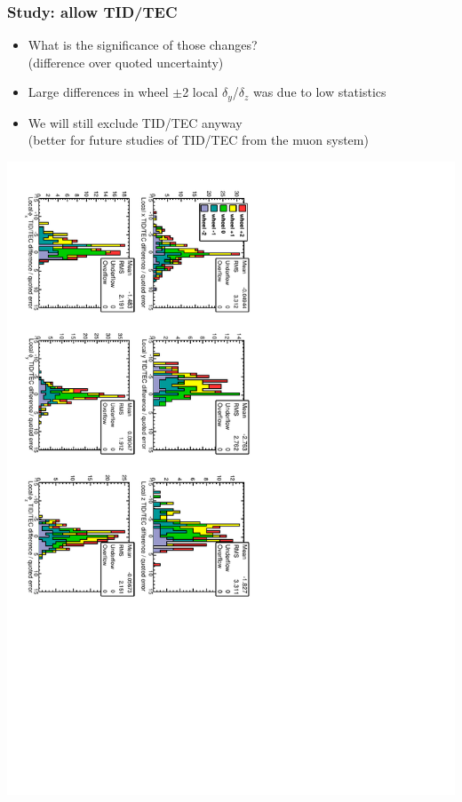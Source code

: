 \documentclass[compress]{beamer}
\begin{document}
\begin{frame}
\frametitle{Study: allow TID/TEC}

\begin{itemize}
\item What is the significance of those changes? \\ (difference over quoted uncertainty)
\item Large differences in wheel $\pm$2 local $\delta_y$/$\delta_z$ was due to low statistics
\item We will still exclude TID/TEC anyway \\ (better for future studies of TID/TEC from the muon system)
\end{itemize}

\includegraphics[height=\linewidth, angle=90]{data_effect_of_TIDTEC_norm.pdf}
\end{frame}
\end{document}
